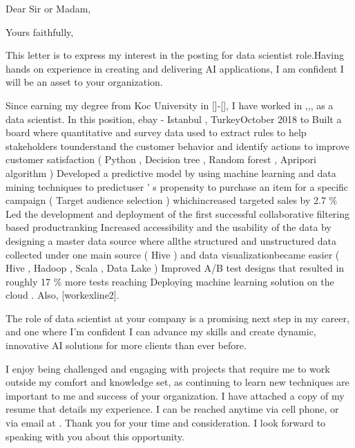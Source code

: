 \documentclass[11pt,a4paper,sans]{moderncv}        %
\begin{document}
\recipient{\quad}{\quad}
\date{March 03 2020}
\opening{Dear Sir or Madam,}
\closing{Yours faithfully,}
\makelettertitle


This letter is to express my interest in the posting for data scientist role.Having hands on experience in creating and delivering AI applications, I am confident I will be an asset to your organization.



Since earning my degree from Koc University  in []-[], I have worked in ,,, as a data scientist. In this position, ebay - Istanbul , TurkeyOctober 2018 to Built a board where quantitative and survey data used to extract rules to help stakeholders tounderstand the customer behavior and identify actions to improve customer satisfaction ( Python , Decision tree , Random forest , Apripori algorithm ) Developed a predictive model by using machine learning and data mining techniques to predictuser ’ s propensity to purchase an item for a specific campaign ( Target audience selection ) whichincreased targeted sales by 2.7 \% Led the development and deployment of the first successful collaborative filtering based productranking Increased accessibility and the usability of the data by designing a master data source where allthe structured and unstructured data collected under one main source ( Hive ) and data visualizationbecame easier ( Hive , Hadoop , Scala , Data Lake ) Improved A/B test designs that resulted in roughly 17 \% more tests reaching Deploying machine learning solution on the cloud . Also, [workexline2]. 

The role of data scientist at your company is a promising next step in my career, and one where I’m confident I can advance my skills and create dynamic, innovative AI solutions for more clients than ever before.

I enjoy being challenged and engaging with projects that require me to work outside my comfort and knowledge set, as continuing to learn new techniques are important to me and success of your organization.
I have attached a copy of my resume that details my experience. I can be reached anytime via cell phone,  or via email at .
Thank you for your time and consideration. I look forward to speaking with you about this opportunity.


\makeletterclosing
\end{document}
